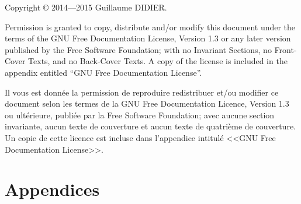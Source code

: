 
\title{\TSwiftTitle}

\newcommand{\TSwiftRoot}[0]{.} %


\frontmatter
\maketitle
\begin{otherlanguage}{english}
Copyright \copyright{}  2014---2015 Guillaume DIDIER.

Permission is granted to copy, distribute and/or modify this document
under the terms of the GNU Free Documentation License, Version 1.3
or any later version published by the Free Software Foundation;
with no Invariant Sections, no Front-Cover Texts, and no Back-Cover Texts.
A copy of the license is included in the appendix entitled ``GNU
Free Documentation License''.
\end{otherlanguage}

Il vous est donnée la permission de reproduire redistribuer et/ou modifier ce document selon les termes de la GNU Free Documentation Licence, Version 1.3 ou ultérieure, publiée par la Free Software Foundation; avec aucune section invariante, aucun texte de couverture et aucun texte de quatrième de couverture.
Un copie de cette licence est incluse dans l'appendice intitulé <<GNU Free Documentation License>>.



\tableofcontents


\mainmatter


\appendix
\part*{Appendices}


%
\backmatter


